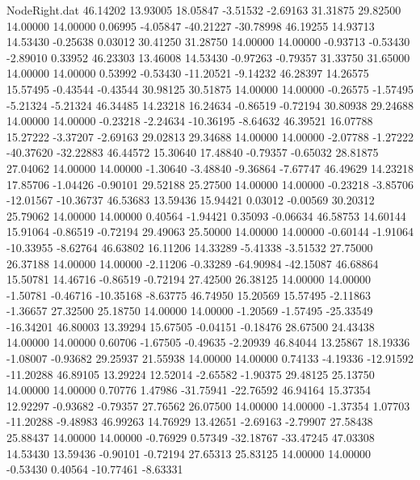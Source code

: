 \begin{filecontents}{NodeRight.dat}
  46.14202   13.93005   18.05847    -3.51532   -2.69163   31.31875   29.82500   14.00000   14.00000    0.06995   -4.05847  -40.21227  -30.78998
  46.19255   14.93713   14.53430    -0.25638    0.03012   30.41250   31.28750   14.00000   14.00000   -0.93713   -0.53430   -2.89010    0.33952
  46.23303   13.46008   14.53430    -0.97263   -0.79357   31.33750   31.65000   14.00000   14.00000    0.53992   -0.53430  -11.20521   -9.14232
  46.28397   14.26575   15.57495    -0.43544   -0.43544   30.98125   30.51875   14.00000   14.00000   -0.26575   -1.57495   -5.21324   -5.21324
  46.34485   14.23218   16.24634    -0.86519   -0.72194   30.80938   29.24688   14.00000   14.00000   -0.23218   -2.24634  -10.36195   -8.64632
  46.39521   16.07788   15.27222    -3.37207   -2.69163   29.02813   29.34688   14.00000   14.00000   -2.07788   -1.27222  -40.37620  -32.22883
  46.44572   15.30640   17.48840    -0.79357   -0.65032   28.81875   27.04062   14.00000   14.00000   -1.30640   -3.48840   -9.36864   -7.67747
  46.49629   14.23218   17.85706    -1.04426   -0.90101   29.52188   25.27500   14.00000   14.00000   -0.23218   -3.85706  -12.01567  -10.36737
  46.53683   13.59436   15.94421     0.03012   -0.00569   30.20312   25.79062   14.00000   14.00000    0.40564   -1.94421    0.35093   -0.06634
  46.58753   14.60144   15.91064    -0.86519   -0.72194   29.49063   25.50000   14.00000   14.00000   -0.60144   -1.91064  -10.33955   -8.62764
  46.63802   16.11206   14.33289    -5.41338   -3.51532   27.75000   26.37188   14.00000   14.00000   -2.11206   -0.33289  -64.90984  -42.15087
  46.68864   15.50781   14.46716    -0.86519   -0.72194   27.42500   26.38125   14.00000   14.00000   -1.50781   -0.46716  -10.35168   -8.63775
  46.74950   15.20569   15.57495    -2.11863   -1.36657   27.32500   25.18750   14.00000   14.00000   -1.20569   -1.57495  -25.33549  -16.34201
  46.80003   13.39294   15.67505    -0.04151   -0.18476   28.67500   24.43438   14.00000   14.00000    0.60706   -1.67505   -0.49635   -2.20939
  46.84044   13.25867   18.19336    -1.08007   -0.93682   29.25937   21.55938   14.00000   14.00000    0.74133   -4.19336  -12.91592  -11.20288
  46.89105   13.29224   12.52014    -2.65582   -1.90375   29.48125   25.13750   14.00000   14.00000    0.70776    1.47986  -31.75941  -22.76592
  46.94164   15.37354   12.92297    -0.93682   -0.79357   27.76562   26.07500   14.00000   14.00000   -1.37354    1.07703  -11.20288   -9.48983
  46.99263   14.76929   13.42651    -2.69163   -2.79907   27.58438   25.88437   14.00000   14.00000   -0.76929    0.57349  -32.18767  -33.47245
  47.03308   14.53430   13.59436    -0.90101   -0.72194   27.65313   25.83125   14.00000   14.00000   -0.53430    0.40564  -10.77461   -8.63331

\end{filecontents}
